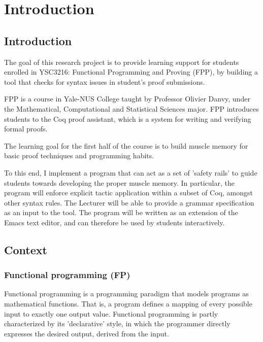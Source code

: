 
\chapter{Introduction} %

\label{intro} %


\section{Introduction}
The goal of this research project is to provide learning support for students enrolled in YSC3216: Functional Programming and Proving (FPP), by building a tool that checks for syntax issues in student's proof submissions.

FPP is a course in Yale-NUS College taught by Professor Olivier Danvy, under the Mathematical, Computational and Statistical Sciences major. FPP introduces students to the Coq proof assistant, which is a system for writing and verifying formal proofs. 

The learning goal for the first half of the course is to build muscle memory for basic proof techniques and programming habits. 

To this end, I implement a program that can act as a set of 'safety rails' to guide students towards developing the proper muscle memory. In particular, the program will enforce explicit tactic application within a subset of Coq, amongst other syntax rules. The Lecturer will be able to provide a grammar specification as an input to the tool. The program will be written as an extension of the Emacs text editor, and can therefore be used by students interactively. 
\section{Context}
\subsection{Functional programming (FP)}
Functional programming is a programming paradigm that models programs as mathematical functions. That is, a program defines a mapping of every possible input to exactly one output value. Functional programming is partly characterized by its 'declarative' style, in which the programmer directly expresses the desired output, derived from the input.

